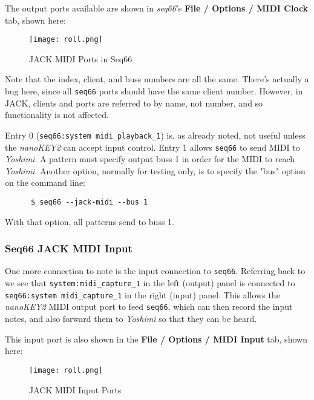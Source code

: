 	The output ports available are shown in \textsl{seq66}'s
	\textbf{File / Options / MIDI Clock} tab, shown here:

\begin{figure}[H]
   \centering 
   \texttt{[image: roll.png]}
   \caption{JACK MIDI Ports in Seq66}
   \label{fig:jack_nano_yosh_midi_clock}
\end{figure}

   Note that the index, client, and buss numbers are all the same.
   There's actually a bug here, since all \texttt{seq66} ports should have the
   same client number.  However, in JACK, clients and ports are referred to by
   name, not number, and so functionality is not affected.

   Entry 0 (\texttt{seq66:system midi\_playback\_1}) is,
   as already noted, not useful unless the \textsl{nanoKEY2} can
   accept input control.  Entry 1 allows \texttt{seq66} to send MIDI
   to \textsl{Yoshimi}.  A pattern must specify output buss 1 in order for the
   MIDI to reach \textsl{Yoshimi}.  Another option, normally for testing only,
   is to specify the "bus" option on the command line:

   \begin{verbatim}
      $ seq66 --jack-midi --bus 1
   \end{verbatim}

   With that option, all patterns send to buss 1.

\subsubsection{Seq66 JACK MIDI Input}
\label{subsubsec:jack_midi_input}

   One more connection to note is the input connection to \texttt{seq66}.
   Referring back to 
   we see that
   \texttt{system:midi\_capture\_1} in the left (output) panel is connected to
   \texttt{seq66:system midi\_capture\_1} in the right (input) panel.
   This allows the \textsl{nanoKEY2} MIDI output port to feed \texttt{seq66},
   which can then record the input notes, and also forward them to
   \textsl{Yoshimi} so that they can be heard.

   This input port is also shown in the \textbf{File / Options / MIDI Input}
   tab, shown here:

\begin{figure}[H]
   \centering 
   \texttt{[image: roll.png]}
   \caption{JACK MIDI Input Ports}
   \label{fig:jack_nano_yosh_midi_input}
\end{figure}

